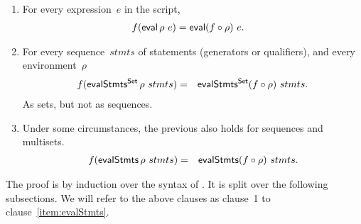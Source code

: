 \begin{prop}
\begin{enumerate}


\item\label{item:eval} For every expression~$e$ in the script,
\begin{eqnarray*}
f(\mathop{\sf eval} \rho ~ e) & = \mathop{\sf eval} (f \circ \rho) ~e .
\end{eqnarray*}

\item\label{item:evalStmtsSet}
For every sequence~$stmts$ of statements (generators or qualifiers), and every
environment~$\rho$\,  
\begin{eqnarray*}
f (\mathop{\sf evalStmts^{Set}} \rho ~ stmts) & = & \mathop{\sf evalStmts^{Set}} (f\circ\rho)~stmts.
\end{eqnarray*}
%
\framebox{***} As sets, but not as sequences. 

\item \label{item:evalStmts}
Under some circumstances, the previous also holds for sequences and
multisets. 
\begin{eqnarray*}
f (\mathop{\sf evalStmts} \rho ~ stmts) & = & \mathop{\sf evalStmts} (f\circ\rho)~stmts.
\end{eqnarray*}

\end{enumerate}
\end{prop}


The proof is by induction over the syntax of \CSPm.  It is split over the
following subsections.  We will refer to the above clauses as clause~1 to
clause~\ref{item:evalStmts}. 

